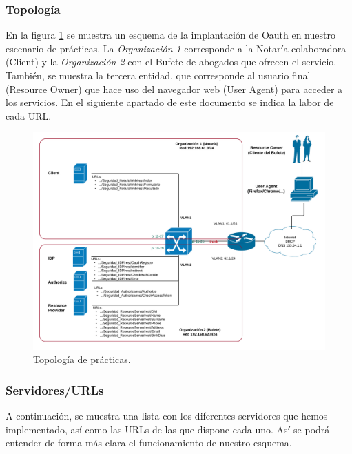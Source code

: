 \documentclass[a4,12pt,onecolum]{article}
\begin{document}

\subsubsection{Topología}
En la figura \ref{fig:oauth8} se muestra un esquema de la implantación de Oauth en nuestro escenario de prácticas. La \emph{Organización 1} corresponde a la Notaría colaboradora (Client) y la \emph{Organización 2} con el Bufete de abogados que ofrecen el servicio. También, se muestra la tercera entidad, que corresponde al usuario final (Resource Owner) que hace uso del navegador web (User Agent) para acceder a los servicios. En el siguiente apartado de este documento se indica la labor de cada URL.

\begin{figure}[htbp]
\centering
\includegraphics[width=1.1\textwidth]{./images/oauth/topo_escenario.png}
\caption{Topología de prácticas.}
\label{fig:oauth8}
\end{figure}





\subsubsection{Servidores/URLs}
A continuación, se muestra una lista con los diferentes servidores que hemos implementado, así como las URLs de las que dispone cada uno. Así se podrá entender de forma más clara el funcionamiento de nuestro esquema.
\end{document}
